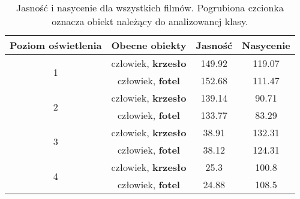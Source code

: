 \begin{table}[H]
    \centering
    \caption{Jasność i nasycenie dla wszystkich filmów. Pogrubiona czcionka oznacza obiekt należący do analizowanej klasy.}
    \begin{tabular}{|c|c|c|c|}
    \hline
    Poziom   oświetlenia & Obecne obiekty                                & Jasność & Nasycenie \\ \hline
    \multirow{2}{*}{1}   & człowiek,   
    \textbf{krzesło} & 149.92  & 119.07    \\ \cline{2-4} 
                         & człowiek, \textbf{fotel}     & 152.68  & 111.47    \\ \hline
    \multirow{2}{*}{2}   & człowiek,   \textbf{krzesło} & 139.14  & 90.71     \\ \cline{2-4} 
                         & człowiek, \textbf{fotel}     & 133.77  & 83.29     \\ \hline
    \multirow{2}{*}{3}   & człowiek,   \textbf{krzesło} & 38.91   & 132.31    \\ \cline{2-4} 
                         & człowiek, \textbf{fotel}     & 38.12   & 124.31    \\ \hline
    \multirow{2}{*}{4}   & człowiek,   \textbf{krzesło} & 25.3    & 100.8     \\ \cline{2-4} 
                         & człowiek, \textbf{fotel}     & 24.88   & 108.5     \\ \hline
    \end{tabular}
    \label{tab:jasnosc-krzeslo-fotel}
    \end{table}
